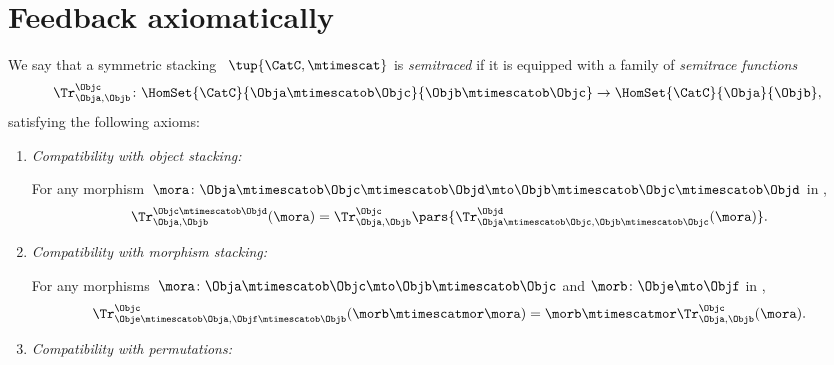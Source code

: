 \section{Feedback axiomatically}

\begin{ctdefinition}
    \label{def:semitraced-assoc-stack-scat}
    We say that a symmetric stacking ~$\tup{\CatC, \mtimescat }$ is \emph{semitraced} if it is equipped with a family of \emph{semitrace functions}
    \begin{equation}
        \Tr_{\Obja,\Objb}^\Objc\colon \HomSet{\CatC}{\Obja \mtimescatob \Objc}{\Objb\mtimescatob \Objc}\to \HomSet{\CatC}{\Obja}{\Objb},
    \end{equation}
    satisfying the following axioms:
    \begin{enumerate}

        \item \emph{Compatibility with object stacking:}

              For any morphism~$\mora \colon \Obja\mtimescatob \Objc \mtimescatob \Objd \mto \Objb\mtimescatob \Objc \mtimescatob \Objd$ in \CatC,
              \begin{equation}
                  \label{eq:semicat-semitrace-vanishing_2}
                  \Tr_{\Obja,\Objb}^{\Objc\mtimescatob \Objd}(\mora)=\Tr_{\Obja,\Objb}^\Objc\pars{
                      \Tr_{\Obja \mtimescatob \Objc, \Objb \mtimescatob \Objc}^\Objd(\mora)}.
              \end{equation}

        \item \emph{Compatibility with morphism stacking:}

              For any morphisms~$\mora\colon \Obja\mtimescatob \Objc \mto \Objb\mtimescatob \Objc$ and $\morb \colon \Obje \mto \Objf$ in \CatC,
              \begin{equation}
                  \label{eq:semicat-semitrace-superposing}
                  \Tr_{\Obje\mtimescatob \Obja,\Objf\mtimescatob \Objb}^{\Objc}(\morb \mtimescatmor \mora)=\morb \mtimescatmor \Tr_{\Obja,\Objb}^\Objc(\mora).
              \end{equation}

        \item \emph{Compatibility with permutations:}


    \end{enumerate}
\end{ctdefinition}

